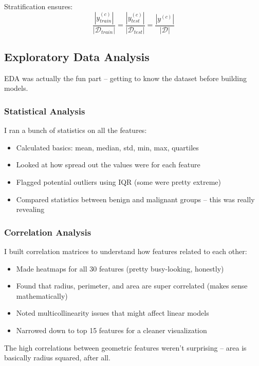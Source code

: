 \documentclass[12pt]{article}
\begin{document}
Stratification ensures:
\begin{equation}
\frac{|y_{train}^{(c)}|}{|\mathcal{D}_{train}|} = \frac{|y_{test}^{(c)}|}{|\mathcal{D}_{test}|} = \frac{|y^{(c)}|}{|\mathcal{D}|}
\end{equation}

\subsection{Exploratory Data Analysis}

EDA was actually the fun part -- getting to know the dataset before building models.

\subsubsection{Statistical Analysis}
I ran a bunch of statistics on all the features:
\begin{itemize}
    \item Calculated basics: mean, median, std, min, max, quartiles
    \item Looked at how spread out the values were for each feature
    \item Flagged potential outliers using IQR (some were pretty extreme)
    \item Compared statistics between benign and malignant groups -- this was really revealing
\end{itemize}

\subsubsection{Correlation Analysis}
I built correlation matrices to understand how features related to each other:
\begin{itemize}
    \item Made heatmaps for all 30 features (pretty busy-looking, honestly)
    \item Found that radius, perimeter, and area are super correlated (makes sense mathematically)
    \item Noted multicollinearity issues that might affect linear models
    \item Narrowed down to top 15 features for a cleaner visualization
\end{itemize}

The high correlations between geometric features weren't surprising -- area is basically radius squared, after all.
\end{document}
